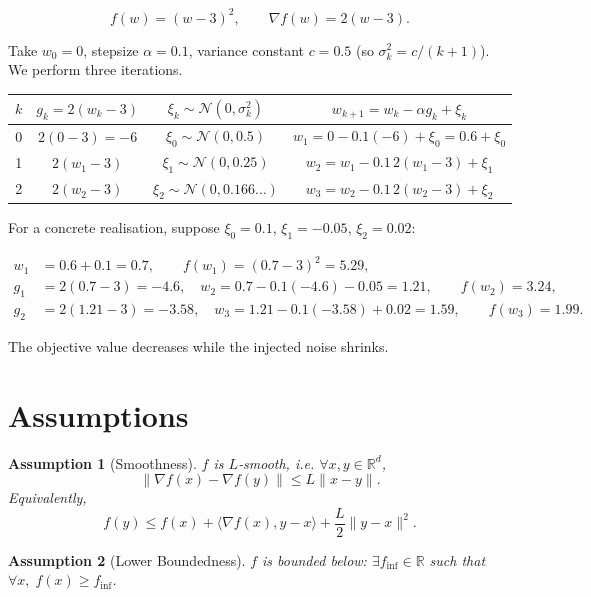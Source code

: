 \documentclass{article}
\newtheorem{assumption}{Assumption}
\newcommand{\R}{\mathbb{R}}
\begin{document}
\[
f(w)=(w-3)^{2},\qquad \nabla f(w)=2(w-3).
\]

Take $w_{0}=0$, stepsize $\alpha=0.1$, variance constant $c=0.5$ (so $\sigma_{k}^{2}=c/(k+1)$).  
We perform three iterations.

\begin{center}
\begin{tabular}{c|c|c|c}
$k$ & $g_{k}=2(w_{k}-3)$ & $\xi_{k}\sim\mathcal N(0,\sigma_{k}^{2})$ & $w_{k+1}=w_{k}-\alpha g_{k}+\xi_{k}$ \\ \hline
0 & $2(0-3)=-6$ & $\xi_{0}\sim\mathcal N(0,0.5)$  & $w_{1}=0-0.1(-6)+\xi_{0}=0.6+\xi_{0}$ \\
1 & $2(w_{1}-3)$ & $\xi_{1}\sim\mathcal N(0,0.25)$ & $w_{2}=w_{1}-0.1\,2(w_{1}-3)+\xi_{1}$ \\
2 & $2(w_{2}-3)$ & $\xi_{2}\sim\mathcal N(0,0.166\ldots)$ & $w_{3}=w_{2}-0.1\,2(w_{2}-3)+\xi_{2}$
\end{tabular}
\end{center}

For a concrete realisation, suppose $\xi_{0}=0.1$, $\xi_{1}=-0.05$, $\xi_{2}=0.02$:

\[
\begin{aligned}
w_{1}&=0.6+0.1=0.7,\qquad f(w_{1})=(0.7-3)^{2}=5.29,\\
g_{1}&=2(0.7-3)=-4.6,\quad w_{2}=0.7-0.1(-4.6)-0.05=1.21,\qquad f(w_{2})=3.24,\\
g_{2}&=2(1.21-3)=-3.58,\quad w_{3}=1.21-0.1(-3.58)+0.02=1.59,\qquad f(w_{3})=1.99.
\end{aligned}
\]

The objective value decreases while the injected noise shrinks.

\newpage
\section*{Assumptions}
\begin{assumption}[Smoothness]\label{ass:smooth}
$f$ is $L$‑smooth, i.e. $\forall x,y\in\R^{d}$,
\[
\|\nabla f(x)-\nabla f(y)\|\le L\|x-y\|.
\tag{A1}
\]
Equivalently,
\[
f(y)\le f(x)+\langle\nabla f(x),y-x\rangle+\frac{L}{2}\|y-x\|^{2}.
\tag{A1'}
\]
\end{assumption}

\begin{assumption}[Lower Boundedness]\label{ass:lb}
$f$ is bounded below: $\exists f_{\inf}\in\R$ such that $\forall x,\;f(x)\ge f_{\inf}$.
\end{assumption}
\end{document}

